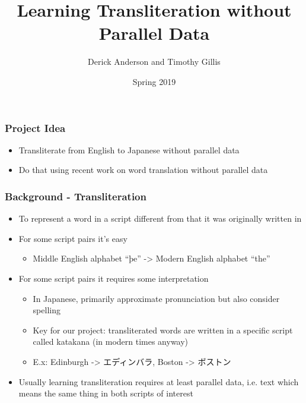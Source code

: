 \documentclass{beamer}
\title{Learning Transliteration without Parallel Data}
\author{Derick Anderson and Timothy Gillis}
\date{Spring 2019}
\begin{document}
 
\frame{\titlepage}
 
\begin{frame}
  \frametitle{Project Idea}

  \begin{itemize}
  \item Transliterate from English to Japanese without parallel data
  \item Do that using recent work on word translation without parallel data
  \end{itemize}

\end{frame}

\begin{frame}
  \frametitle{Background - Transliteration}

  \begin{itemize}
  \item To represent a word in a script different from that it was originally
    written in
  \item For some script pairs it's easy
    \begin{itemize}
      \item Middle English alphabet ``þe'' -> Modern English alphabet ``the''
    \end{itemize}

  \item For some script pairs it requires some interpretation
    \begin{itemize}
    \item In Japanese, primarily approximate pronunciation but also consider
      spelling
    \item Key for our project: transliterated words are written in a specific
      script called katakana (in modern times anyway)
    \item E.x: Edinburgh -> エディンバラ, Boston -> ボストン
    \end{itemize}

  \item Usually learning transliteration requires at least parallel data,
    i.e. text which means the same thing in both scripts of interest
  \end{itemize}

\end{frame}
\end{document}
